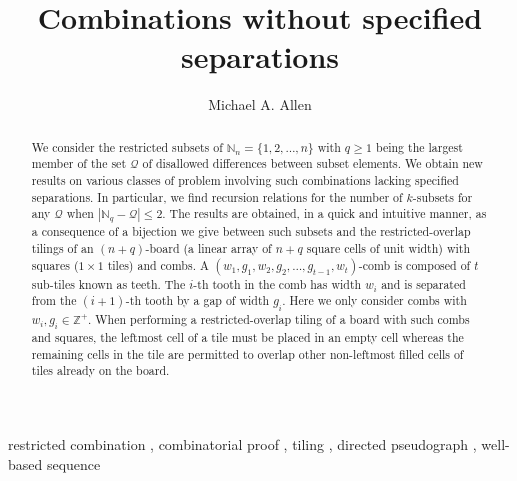 \documentclass[preprint,3p]{elsarticle}
\newcommand{\abs}[1]{\left\lvert#1\right\rvert}
\begin{document}
\title{
Combinations without specified separations
}
\author{Michael A. Allen}
\address{Physics Department, Faculty of Science,
Mahidol University, Rama 6 Road, Bangkok
10400, Thailand}

\begin{abstract}
We consider the restricted subsets of $\mathbb{N}_n=\{1,2,\ldots,n\}$ with
$q\geq1$ being the largest member of the set $\mathcal{Q}$ of
disallowed differences between subset elements. We obtain new results
on various classes of problem involving such combinations lacking specified
separations.  In particular, we find recursion relations for
the number of $k$-subsets for any $\mathcal{Q}$ when
$\abs{\mathbb{N}_q-\mathcal{Q}}\leq2$.  The results are obtained, in a
quick and intuitive manner, as a consequence of a bijection we give
between such subsets and the restricted-overlap tilings of an
$(n+q)$-board (a linear array of $n+q$ square cells of unit width) with
squares ($1\times1$ tiles) and combs.  A
$(w_1,g_1,w_2,g_2,\ldots,g_{t-1},w_t)$-comb is composed of $t$
sub-tiles known as teeth.  The $i$-th tooth in the comb has width
$w_i$ and is separated from the $(i+1)$-th tooth by a gap of width
$g_i$. Here we only consider combs with $w_i,g_i\in\mathbb{Z}^+$.  When
performing a restricted-overlap tiling of a board with such combs and
squares, the leftmost cell of a tile must be placed in an empty cell
whereas the remaining cells in the tile are permitted to overlap other
non-leftmost filled cells of tiles already on the board.
\end{abstract}

\begin{keyword}
restricted combination
  \sep
combinatorial proof
  \sep
tiling
  \sep
directed pseudograph
  \sep
well-based sequence
\end{keyword}

\maketitle
\end{document}
